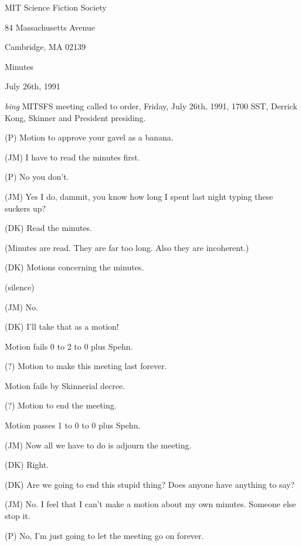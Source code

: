 \setlength{\topmargin}{-0.5in}
\setlength{\oddsidemargin}{0.0in}
\setlength{\evensidemargin}{0.0in}
\setlength{\textheight}{9in}
\setlength{\textwidth}{6.5in}



\begin{center}
MIT Science Fiction Society

84 Massachusetts Avenue

Cambridge, MA 02139

\vspace{0.2in}
Minutes

July 26th, 1991

\end{center}

\vspace{0.15in}
{\em bing\/}  MITSFS meeting called to order, Friday, July 26th, 1991,
1700 SST, Derrick Kong, Skinner and President presiding.

(P) Motion to approve your gavel as a banana.

(JM) I have to read the minutes first.

(P) No you don't.

(JM) Yes I do, dammit, you know how long I spent last night typing these
suckers up?

(DK) Read the minutes.

(Minutes are read.  They are far too long.  Also they are incoherent.)

(DK) Motions concerning the minutes.

(silence)

(JM) No.

(DK) I'll take that as a motion!

Motion fails 0 to 2 to 0 plus Spehn.

(?) Motion to make this meeting last forever.

Motion fails by Skinnerial decree.

(?) Motion to end the meeting.

Motion passes 1 to 0 to 0 plus Spehn.

(JM) Now all we have to do is adjourn the meeting.

(DK) Right.

(DK) Are we going to end this stupid thing?  Does anyone have anything
to say?

(JM) No.  I feel that I can't make a motion about my own minutes.
Someone else stop it.

(P) No, I'm just going to let the meeting go on forever.

